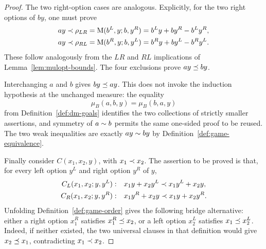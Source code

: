 \begin{proof}
  The two right-option cases are analogous.  Explicitly, for the two right
  options of \(by\), one must prove
  \[
    \begin{aligned}
      ay&\prec \rho_{LR}
        =\operatorname{M}(b^L,y;b,y^R)=b^Ly+by^R-b^Ly^R,\\
      ay&\prec \rho_{RL}
        =\operatorname{M}(b^R,y;b,y^L)=b^Ry+by^L-b^Ry^L.
    \end{aligned}
  \]
  These follow analogously from the \(LR\) and \(RL\) implications of
  Lemma~\ref{lem:mulopt-bounds}.  The four exclusions prove \(ay\preceq by\).

  Interchanging \(a\) and \(b\) gives \(by\preceq ay\).  This does not invoke
  the induction hypothesis at the unchanged measure: the equality
  \[
    \mu_B(a,b,y)=\mu_B(b,a,y)
  \]
  from Definition~\ref{def:dm-goals} identifies the two collections of
  strictly smaller assertions, and symmetry of \(a\sim b\) permits the
  same one-sided proof to be reused.  The two weak inequalities are exactly
  \(ay\sim by\) by Definition~\ref{def:game-equivalence}.

  Finally consider \(C(x_1,x_2,y)\), with \(x_1\prec x_2\).  The assertion
  to be proved is that, for every left option \(y^L\) and right option \(y^R\)
  of \(y\),
  \[
    \begin{aligned}
      C_L(x_1,x_2;y,y^L):\quad
        &x_1y+x_2y^L\prec x_1y^L+x_2y,\\
      C_R(x_1,x_2;y,y^R):\quad
        &x_1y^R+x_2y\prec x_1y+x_2y^R.
    \end{aligned}
  \]
  Unfolding Definition~\ref{def:game-order} gives the following bridge
  alternative: either a right option \(x_1^R\) satisfies
  \(x_1^R\preceq x_2\), or a left option \(x_2^L\) satisfies
  \(x_1\preceq x_2^L\).  Indeed, if neither existed, the two universal clauses
  in that definition would give \(x_2\preceq x_1\), contradicting
  \(x_1\prec x_2\).


\end{proof}
